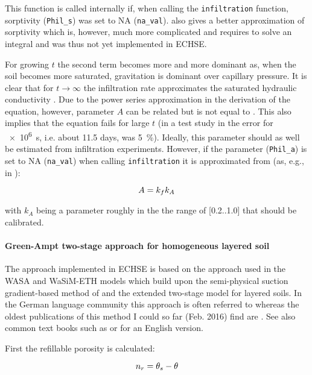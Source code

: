 \noindent
This function is called internally if, when calling the \verb!infiltration! function, sorptivity (\verb!Phil_s!) was set to NA (\verb!na_val!). \citet{Stewart2013} also gives a better approximation of sorptivity which is, however, much more complicated and requires to solve an integral and was thus not yet implemented in ECHSE.

For growing $t$ the second term becomes more and more dominant as, when the soil becomes more saturated, gravitation is dominant over capillary pressure. It is clear that for $t\to\infty$ the infiltration rate approximates the saturated hydraulic conductivity \satHydrCond{}. Due to the power series approximation in the derivation of the equation, however, parameter $A$ can be related but is not equal to \satHydrCond{}. This also implies that the equation fails for large $t$ (in a test study in \citet{Philip1957d} the error for \SI{e6}{\second}, i.e. about \num{11.5} days, was \SI{5}{\percent}). Ideally, this parameter should as well be estimated from infiltration experiments. However, if the parameter (\verb!Phil_a!) is set to NA (\verb!na_val!) when calling \verb!infiltration! it is approximated from \satHydrCond{} (as, e.g., in \citet{Kreye2010en}):

\begin{equation}
A = k_{f} k_A
\end{equation}

\noindent
with $k_A$ being a parameter roughly in the the range of [\num{0.2}..\num{1.0}] that should be calibrated.


\paragraph{Green-Ampt two-stage approach for homogeneous layered soil}
The approach implemented in ECHSE is based on the approach used in the WASA \citep{Guentner2002} and WaSiM-ETH \citep{Schulla1997} models which build upon the semi-physical suction gradient-based method of \citet{GreenAmpt1911} and the extended two-stage model for layered soils. In the German language community this approach is often referred to \citet{Peschke1977,Peschke1987} whereas the oldest publications of this method I could so far (Feb. 2016) find are \citet{Mein1971,Mein1973}. See also common text books such as \citet{Dyck1995} or \citet{Chow1988} for an English version.

First the refillable porosity is calculated:

\begin{equation}
n_r = \theta_s - \theta
\end{equation}

